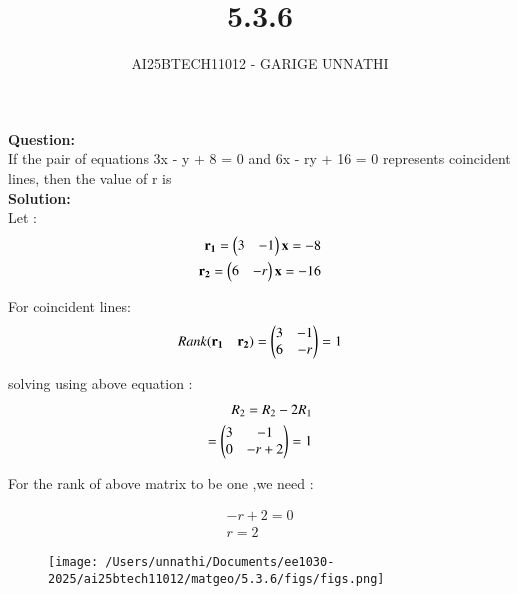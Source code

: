 \documentclass[journal]{IEEEtran}
\begin{document}

\vspace{3cm}

\title{5.3.6}
\author{AI25BTECH11012 - GARIGE UNNATHI}
{\let\newpage\relax\maketitle}


\renewcommand{\thefigure}{\theenumi}
\renewcommand{\thetable}{\theenumi}
\setlength{\intextsep}{10pt} %


\renewcommand{\thetable}{\theenumi}


\textbf{Question:}\\
If the pair of equations 3x - y + 8 = 0 and 6x - ry + 16 = 0 represents coincident
lines, then the value of r is  \\

\textbf{Solution:}\\
Let :
\begin{align}
    \mathbf{r_1} = \begin{pmatrix}3 & -1 \end{pmatrix}\mathbf{x} = -8 \\
    \mathbf{r_2} = \begin{pmatrix}6 & -r\end{pmatrix}\mathbf{x} = -16
\end{align}

For coincident lines:
\begin{align}
   Rank( \mathbf{r_1} \quad \mathbf{r_2})  = \begin{pmatrix}3 & -1\\
                                              6 & -r\end{pmatrix}= 1
\end{align}

solving using above equation :
\begin{align}
   R_2 = R_2 - 2R_1\\
    =  \begin{pmatrix}3 & -1\\
               0 & -r + 2\end{pmatrix}= 1
\end{align}

For the rank of above matrix to be one ,we need :

\begin{align}
   -r + 2 =0 \\
   r = 2 
\end{align}

\begin{figure}[h!]
   \centering
   \texttt{[image: /Users/unnathi/Documents/ee1030-2025/ai25btech11012/matgeo/5.3.6/figs/figs.png]}
   \caption{}
   \label{stemplot}
\end{figure}
\end{document}
